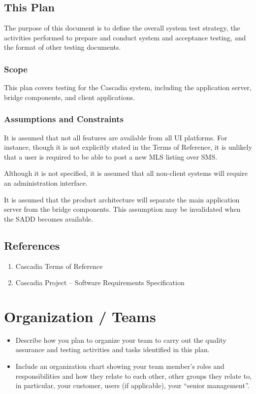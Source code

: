 \documentclass[11pt]{report}
\begin{document}
\section{This Plan}
The purpose of this document is to define the overall system test strategy, the activities performed
to prepare and conduct system and acceptance testing, and the format of other testing documents.

\subsection{Scope}
This plan covers testing for the Cascadia system, including the application server, bridge
components, and client applications.

\subsection{Assumptions and Constraints}
It is assumed that not all features are available from all UI platforms.  For instance, though it is
not explicitly stated in the Terms of Reference, it is unlikely that a user is required to be able
to post a new MLS listing over SMS.

Although it is not specified, it is assumed that all non-client systems will require an
administration interface.

It is assumed that the product architecture will separate the main application server from the
bridge components.  This assumption may be invalidated when the SADD becomes available.

\section{References}
\begin{enumerate}[(1)]
\item Cascadia Terms of Reference
\item Cascadia Project -- Software Requirements Specification
\end{enumerate}


\chapter{Organization / Teams}
\begin{itemize}
\item Describe how you plan to organize your team to carry out the quality assurance and testing
  activities and tasks identified in this plan.
\item Include an organization chart showing your team member’s roles and responsibilities and how
  they relate to each other, other groups they relate to, in particular, your customer, users (if
  applicable), your “senior management”.
\end{itemize}
\end{document}
